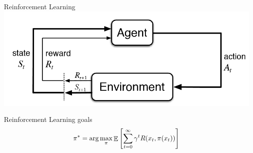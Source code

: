 \documentclass{beamer}
\begin{document}
\begin{frame}{Reinforcement Learning}
\includegraphics[width=\linewidth]{../gfx/rl_cycle.png}

\begin{block}{Reinforcement Learning goals}
$$\pi^* = \text{arg}\max_\pi \mathop{\mathbb{E}} \left[ \sum_{t=0}^\infty \gamma^tR(x_t,\pi(x_t))\right]$$
\end{block}
\end{frame}


%


%
\end{document}
